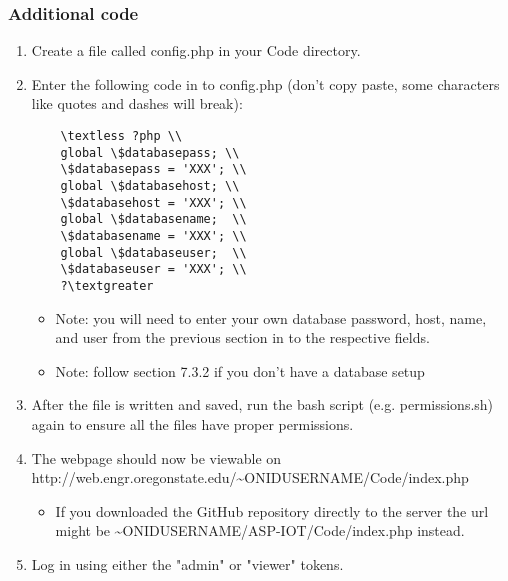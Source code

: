 \documentclass[onecolumn, draftclsnofoot,10pt, compsoc]{IEEEtran}
\begin{document}
\subsubsection{Additional code}
\begin{enumerate}
    \item Create a file called config.php in your Code directory. 
    \item Enter the following code in to config.php (don't copy paste, some characters like quotes and dashes will break):

    \begin{lstlisting}
    \textless ?php \\
    global \$databasepass; \\
    \$databasepass = 'XXX'; \\
    global \$databasehost; \\
    \$databasehost = 'XXX'; \\
    global \$databasename;  \\
    \$databasename = 'XXX'; \\
    global \$databaseuser;  \\
    \$databaseuser = 'XXX'; \\
    ?\textgreater
    \end{lstlisting}
    \begin{itemize}
        \item Note: you will need to enter your own database password, host, name, and user from the previous section in to the respective fields.
        \item Note: follow section 7.3.2 if you don't have a database setup
    \end{itemize}
    \item After the file is written and saved, run the bash script (e.g. permissions.sh) again to ensure all the files have proper permissions. 
    \item The webpage should now be viewable on http://web.engr.oregonstate.edu/\textasciitilde{}ONIDUSERNAME/Code/index.php 
    \begin{itemize}
        \item If you downloaded the GitHub repository directly to the server the url might be \textasciitilde{}ONIDUSERNAME/ASP-IOT/Code/index.php instead.
    \end{itemize}
    \item Log in using either the "admin" or "viewer" tokens.
\end{enumerate}
\end{document}

